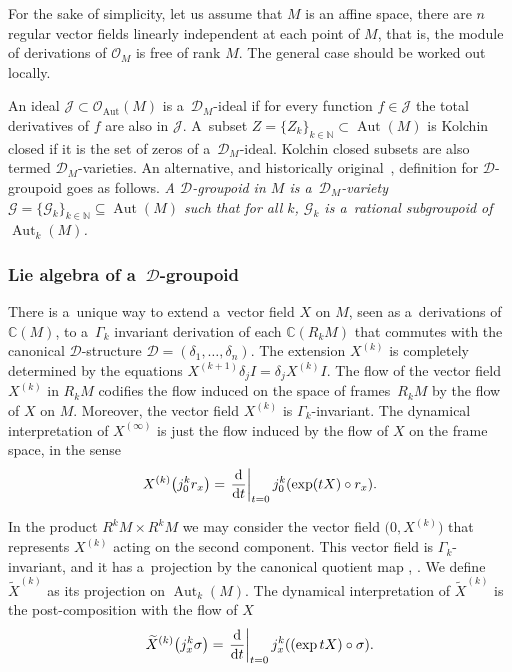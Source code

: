 \documentclass[pdftex]{sigma}
\numberwithin{equation}{section}
\theoremstyle{definition}
\begin{document}
For the sake of simplicity, let us assume that $M$ is an affine space, there are $n$ regular vector fields linearly independent at each point of $M$, that is, the module of derivations of $\mathcal O_M$ is free of rank $M$. The general case should be worked out locally.

An ideal $\mathcal J \subset \mathcal O_{\operatorname{Aut}}(M)$ is a~$\mathcal D_M$-ideal if for every function $f\in \mathcal J$ the total derivatives of $f$ are also in $\mathcal J$. A~subset $Z = \{Z_k\}_{k\in\mathbb N} \subset \operatorname{Aut}(M)$ is Kolchin closed if it is the set of zeros of a~$\mathcal D_M$-ideal. Kolchin closed subsets are also termed $\mathcal D_M$-varieties. An alternative, and historically original~\cite{malgrange2001groupoide}, definition for $\mathcal D$-groupoid goes as follows. \emph{A $\mathcal D$-groupoid in $M$ is a~$\mathcal D_M$-variety~${\mathcal G = \{\mathcal G_k\}_{k\in \mathbb N} \subseteq \operatorname{Aut}(M)}$ such that for all $k$, $\mathcal G_k$ is a~rational subgroupoid of $\operatorname{Aut}_k(M)$. }

\subsubsection[Lie algebra of a~D-groupoid]{Lie algebra of a~$\boldsymbol{\mathcal D}$-groupoid}

There is a~unique way to extend a~vector field $X$ on $M$, seen as a~derivations of $\mathbb C(M)$, to a~$\Gamma_k$ invariant derivation of each $\mathbb C(R_kM)$ that commutes with the canonical $\mathcal D$-structure $\mathcal D = (\delta_1,\dots,\delta_n)$. The extension $X^{(k)}$ is completely determined by the equations
$X^{(k+1)} \delta_j I = \delta_j X^{(k)}I$.
The flow of the vector field $X^{(k)}$ in $R_kM$ codifies the flow induced on the space of frames~$R_kM$ by the flow of $X$ on $M$. Moreover, the vector field $X^{(k)}$ is $\Gamma_k$-invariant. The dynamical interpretation of $X^{(\infty)}$ is just the flow induced by the flow of $X$ on the frame space, in the sense
\[X^{(k)}\bigl(j^k_0r_x\bigr) = \left.\frac{{\rm d}}{{\rm d} t}\right\vert_{t=0} j^k_0(\exp(tX)\circ r_x).\]

In the product $R^kM\times R^kM$ we may consider the vector field $\bigl(0,X^{(k)}\bigr)$ that represents $X^{(k)}$ acting on the second component. This vector field is $\Gamma_k$-invariant, and it has a~projection by the canonical quotient map , . We define $\widetilde X^{(k)}$ as its projection on $\operatorname{Aut}_k(M)$. The dynamical interpretation of $\widetilde X^{(k)}$ is the post-composition with the flow of $X$
\[\widetilde X^{(k)}\bigl(j_x^k \sigma\bigr) = \left.\frac{{\rm d}}{{\rm d} t}\right\vert_{t=0} j_x^k((\exp tX)\circ \sigma).\]
\end{document}
